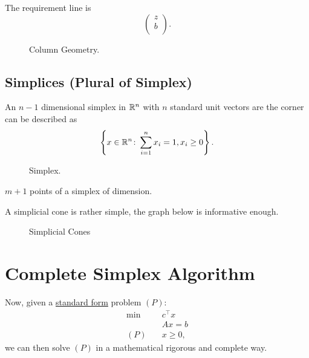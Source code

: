 The requirement line is
\[
	\begin{pmatrix}
		z \\
		b \\
	\end{pmatrix}.
\]

\begin{figure}[H]
	\centering
	\caption{Column Geometry.}
	\label{fig:column-geometry}
\end{figure}

\subsection{Simplices (Plural of Simplex)}
\begin{eg}[Simplex]
	An \(n-1\) dimensional simplex in \(\mathbb{\MakeUppercase{R}}^n\) with \(n\) standard unit vectors are the corner can be described as
	\[
		\left\{x\in \mathbb{\MakeUppercase{R}}^n \colon \sum\limits_{i=1}^{n} x_i = 1, x_i \geq 0\right\}.
	\]
	\begin{figure}[H]
		\centering
		\caption{Simplex.}
		\label{fig:simplex}
	\end{figure}
\end{eg}

\begin{note}
	\(m+1\) points of a simplex of dimension.
\end{note}

A simplicial cone is rather simple, the graph below is informative enough.
\begin{figure}[H]
	\centering
	\caption{Simplicial Cones}
	\label{fig:simplicial-cones}
\end{figure}

\section{Complete Simplex Algorithm}
Now, given a \hyperref[def:standard-form]{standard form} problem \((P)\):
\[
	\begin{aligned}
		\min~    & c^{\top}x \\
		         & Ax = b    \\
		(P)\quad & x\geq 0,
	\end{aligned}
\]
we can then solve \((P)\) in a mathematical rigorous and complete way.

